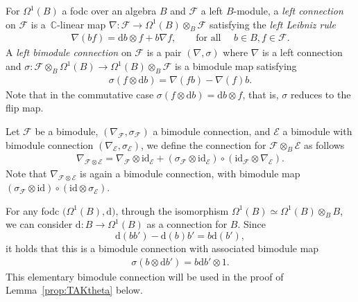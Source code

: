 \documentclass[pdftex]{sigma}
\numberwithin{equation}{section}
\begin{document}
For $\Omega^1(B)$ a fodc over an algebra $B$ and $\mathcal{F}$ a left $B$-module, a \emph{left connection} on $\mathcal{F}$ is a~$\mathbb{C}$-linear map $\nabla\colon \mathcal{F} \to \Omega^1(B)\otimes_B \mathcal{F}$ satisfying the \emph{left Leibniz rule}
\begin{gather*}
\nabla(bf) = \mathrm{d} b \otimes f + b \nabla f, \qquad \textrm{for all } \quad b \in B, f \in \mathcal{F}.
\end{gather*}
A \emph{left bimodule connection} on $\mathcal{F}$ is a pair $(\nabla,\sigma)$ where $\nabla$ is a left connection and $\sigma\colon \mathcal{F} \otimes_B \Omega^1(B) \rightarrow \Omega^1(B) \otimes_B \mathcal{F} $ is a bimodule map satisfying
\begin{gather}\label{eqn:BiC}
 \sigma (f\otimes \mathrm{d}b)= \nabla (fb)-\nabla(f)b.
\end{gather}
Note that in the commutative case $\sigma(f \otimes \mathrm{d} b) = \mathrm{d} b \otimes f$, that is, $\sigma$ reduces to the flip map.

Let $\mathcal{F}$ be a bimodule, $(\nabla_{\mathcal{F}}, \sigma_{\mathcal{F}})$ a bimodule connection, and $\mathcal{E}$ a bimodule with bimodule connection $(\nabla_\mathcal{E}, \sigma_{\mathcal{E}})$, we define the connection for $\mathcal{F} \otimes_B \mathcal{E}$ as follows
\begin{gather}\label{eqn:bimcontenpr}
 \nabla_{\mathcal{F}\otimes \mathcal{E}}= \nabla_{\mathcal{F}}\otimes \mathrm{id}_{\mathcal{E}}+(\sigma_{\mathcal{F}}\otimes \mathrm{\mathrm{id}}_\mathcal{E})\circ (\mathrm{id}_{\mathcal{F}}\otimes \nabla_{\mathcal{E}}).
\end{gather}
Note that $\nabla_{\mathcal{F} \otimes \mathcal{E}}$ is again a bimodule connection, with bimodule map $(\sigma_{\mathcal{F}} \otimes \mathrm{id}) \circ (\mathrm{id} \otimes \sigma_{\mathcal{E}})$.

\begin{eg} \label{eg:trivialBimodConn}
For any fodc $\big(\Omega^1(B),\mathrm{d}\big)$, through the isomorphism $\Omega^1(B) \simeq \Omega^1(B) \otimes_B B$, we can consider $\mathrm{d}\colon B \to \Omega^1(B)$ as a connection for $B$. Since
\[
\mathrm{d}(bb') - \mathrm{d}(b)b' = b\mathrm{d}(b'),
\]
it holds that this is a bimodule connection with associated bimodule map
\begin{gather*}
\sigma(b \otimes \mathrm{d} b') = b\mathrm{d} b' \otimes 1.
\end{gather*}
This elementary bimodule connection will be used in the proof of Lemma~\ref{prop:TAKtheta} below.
\end{eg}
\end{document}
